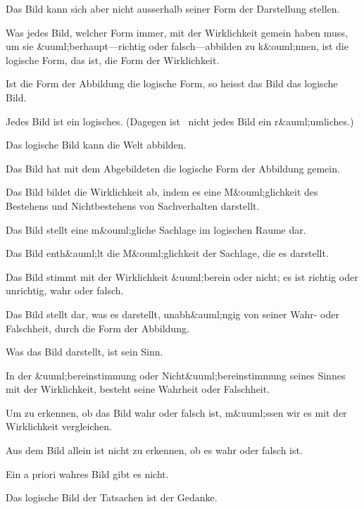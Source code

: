 {Das Bild kann sich aber nicht ausserhalb seiner
Form der Darstellung stellen.}


{Was jedes Bild, welcher Form immer, mit der
Wirklichkeit gemein haben muss, um sie &uuml;berhaupt---richtig
oder falsch---ab\-bil\-den zu k&ouml;nnen,
ist die logische Form, das ist, die Form der
Wirklichkeit.}


{Ist die Form der Abbildung die logische Form,
so heisst das Bild das logische Bild.}


{Jedes Bild ist  ein logisches. (Dagegen
ist \zumBeispiel\ nicht jedes Bild ein r&auml;umliches.)}


{Das logische Bild kann die Welt abbilden.}


{Das Bild hat mit dem Abgebildeten die logische
Form der Abbildung gemein.}


{Das Bild bildet die Wirklichkeit ab, indem es
eine M&ouml;glichkeit des Bestehens und Nichtbestehens
von Sachverhalten darstellt.}


{Das Bild stellt eine m&ouml;gliche Sachlage im
logischen Raume dar.}


{Das Bild enth&auml;lt die M&ouml;glichkeit der Sachlage,
die es darstellt.}


{Das Bild stimmt mit der Wirklichkeit &uuml;berein
oder nicht; es ist richtig oder unrichtig, wahr
oder falsch.}


{{\stretchyspace
Das Bild stellt dar, was es darstellt, unabh&auml;ngig
von seiner Wahr- oder Falschheit, durch die Form
der Abbildung.}}


{Was das Bild darstellt, ist sein Sinn.}


{In der &uuml;bereinstimmung oder Nicht&uuml;bereinstimmung
seines Sinnes mit der Wirklichkeit,
besteht seine Wahrheit oder Falschheit.}


{Um zu erkennen, ob das Bild wahr oder falsch
ist, m&uuml;ssen wir es mit der Wirklichkeit vergleichen.}


{Aus dem Bild allein ist nicht zu erkennen, ob
es wahr oder falsch ist.}


{Ein a priori wahres Bild gibt es nicht.}


{Das logische Bild der Tatsachen ist der
Gedanke.}


